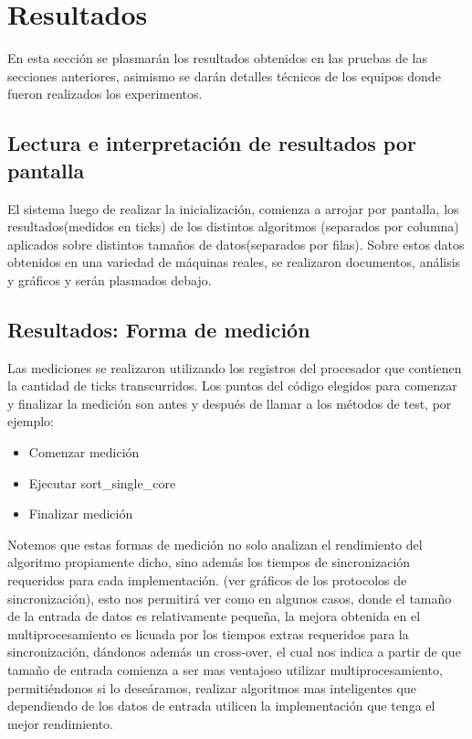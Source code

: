 \section{Resultados}
En esta sección se plasmarán los resultados obtenidos en las pruebas de las secciones anteriores, asimismo se darán detalles técnicos de los equipos donde fueron realizados los experimentos.
\subsection{Lectura e interpretación de resultados por pantalla}
El sistema luego de realizar la inicialización, comienza a arrojar por pantalla, los resultados(medidos en ticks) de los distintos algoritmos (separados por columna) aplicados sobre distintos tamaños de datos(separados por filas). Sobre estos datos obtenidos en una variedad de máquinas reales, se realizaron documentos, análisis y gráficos y serán plasmados debajo.
\subsection{Resultados: Forma de medición}
Las mediciones se realizaron utilizando los registros del procesador que contienen la cantidad de ticks transcurridos. Los puntos del código elegidos para comenzar y finalizar la medición son antes y después de llamar a los métodos de test, por ejemplo:
\begin{itemize}
	\item Comenzar medición
	\item Ejecutar sort\_single\_core\(\)
	\item Finalizar medición
\end{itemize}

Notemos que estas formas de medición no solo analizan el rendimiento del algoritmo propiamente dicho, sino además los tiempos de sincronización requeridos para cada implementación. (ver gráficos de los protocolos de sincronización), esto nos permitirá ver como en algunos casos, donde el tamaño de la entrada de datos es relativamente pequeña, la mejora obtenida en el multiprocesamiento es licuada por los tiempos extras requeridos para la sincronización, dándonos además un cross-over, el cual nos indica a partir de que tamaño de entrada comienza a ser mas ventajoso utilizar multiprocesamiento, permitiéndonos si lo deseáramos, realizar algoritmos mas inteligentes que dependiendo de los datos de entrada utilicen la implementación que tenga el mejor rendimiento.


